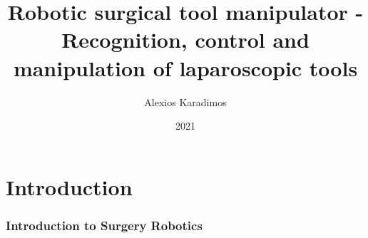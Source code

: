 \documentclass{beamer}
\title{Robotic surgical tool manipulator - Recognition, control and manipulation of laparoscopic tools}
\author{Alexios Karadimos}
\institute{Deparment of Electrical and Computer Engineering}
\date{2021}
\begin{document}


\frame{\titlepage}

\section{Introduction}


\begin{frame}
\frametitle{Introduction to Surgery Robotics}

\end{frame}
\end{document}
